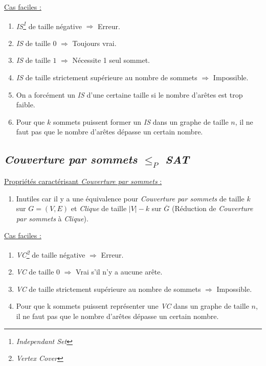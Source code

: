  \underline{Cas faciles :}
  \begin{enumerate}
   \item \emph{IS\footnote{\emph{Independant Set}}} de taille négative
	 $\Rightarrow$ Erreur.
   \item \emph{IS} de taille $0$ $\Rightarrow$ Toujours vrai.
   \item \emph{IS} de taille $1$ $\Rightarrow$ Nécessite 1 seul sommet.
   \item \emph{IS} de taille strictement supérieure au nombre de sommets
	 $\Rightarrow$ Impossible.
   \item On a forcément un \emph{IS} d'une certaine taille si le nombre
	 d'arêtes est trop faible.
   \item Pour que $k$ sommets puissent former un \emph{IS} dans un
	 graphe de taille $n$, il ne faut pas que le nombre d'arêtes
	 dépasse un certain nombre.
  \end{enumerate}

  \subsection{\emph{Couverture par sommets} $\leq_P$ \emph{SAT}}
  \underline{Propriétés caractérisant \emph{Couverture par sommets} :}
  \begin{enumerate}
   \item Inutiles car il y a une équivalence pour \emph{Couverture par
	 sommets} de taille $k$ sur $G = (V,E)$ et \emph{Clique} de
	 taille $|V|-k$ sur $\overline{G}$ (Réduction de
	 \emph{Couverture par sommets} à \emph{Clique}).
  \end{enumerate}

  \underline{Cas faciles :}
  \begin{enumerate}
   \item \emph{VC\footnote{\emph{Vertex Cover}}} de taille négative
	 $\Rightarrow$ Erreur.
   \item \emph{VC} de taille $0$ $\Rightarrow$ Vrai s'il n'y a aucune
	 arête.
   \item \emph{VC} de taille strictement supérieure au nombre de sommets
	 $\Rightarrow$ Impossible.
   \item Pour que k sommets puissent représenter une \emph{VC} dans un
	 graphe de taille $n$, il ne faut pas que le nombre d'arêtes
	 dépasse un certain nombre.
  \end{enumerate}

